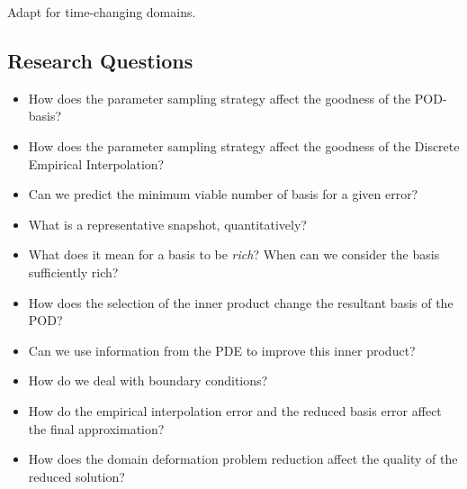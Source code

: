 \documentclass[../main.tex]{subfiles}
\begin{document}
Adapt \cite{2005_aPosterioriErrorBoundsReducedBasisApproximationsParametrizedParabolicPde_Grepl,2015_efficientModelReductionParametrizedSystemsMatrixDeim_Negri} for time-changing domains.

\subsection{Research Questions}

\begin{itemize}
    \item How does the parameter sampling strategy affect the goodness of the POD-basis?
    \item How does the parameter sampling strategy affect the goodness of the Discrete Empirical Interpolation?
    \item Can we predict the minimum viable number of basis for a given error?
    \item What is a representative snapshot, quantitatively?
    \item What does it mean for a basis to be \textit{rich}? When can we consider the basis sufficiently rich?
    \item How does the selection of the inner product change the resultant basis of the POD?
    \item Can we use information from the PDE to improve this inner product?
    \item How do we deal with boundary conditions?
    \item How do the empirical interpolation error and the reduced basis error affect the final approximation?
    \item How does the domain deformation problem reduction affect the quality of the reduced solution?
\end{itemize}


\printbibliography
\end{document}
